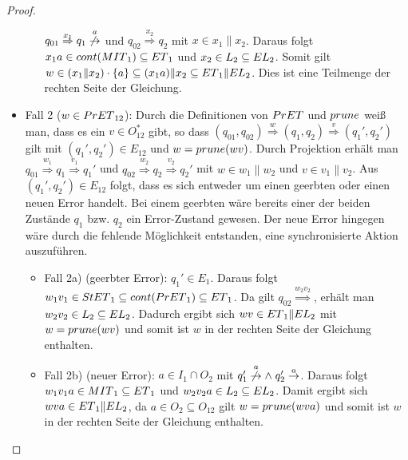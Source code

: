 \begin{proof}
\begin{itemize}
\begin{itemize}
      $q_{01}\overset{x_1}{\Rightarrow} q_1
      \overset{a}{\not{\hspace{-0.1cm}\rightarrow}}$ und
      $q_{02}\overset{x_2}{\Rightarrow} q_2$ mit $x\in x_1\|x_2$. Daraus folgt
      $x_1a\in cont{}(MIT{}_1)\subseteq ET{}_1$ und $x_2\in L_2\subseteq EL{}_2$. Somit
      gilt $w\in (x_1\| x_2)\cdot\{a\}\subseteq (x_1a)\|x_2\subseteq ET{}_1\|EL{}_2$.
      Dies ist eine Teilmenge der rechten Seite der Gleichung.
  \end{itemize}
    \item Fall 2 ($w\in PrET{}_{12}$): Durch die Definitionen von $PrET{}$
      und $prune{}$ weiß man, dass es ein $v\in O_{12}^*$ gibt, so dass
      $(q_{01},q_{02}) \overset{w}{\Rightarrow} (q_1,q_2)
      \overset{v}{\Rightarrow} (q_1',q_2')$ gilt mit $(q_1',q_2')\in E_{12}$
      und $w=prune{}(wv)$. Durch Projektion erhält man $q_{01}
      \overset{w_1}{\Rightarrow} q_1 \overset{v_1}{\Rightarrow} q_1'$ und
      $q_{02} \overset{w_2}{\Rightarrow} q_2 \overset{v_2}{\Rightarrow} q_2'$
      mit $w\in w_1\|w_2$ und $v\in v_1\|v_2$. Aus $(q_1',q_2')\in E_{12}$
      folgt, dass es sich entweder um einen geerbten oder einen neuen Error
      handelt. Bei einem geerbten wäre bereits einer der beiden Zustände $q_1$
      bzw. $q_2$ ein Error-Zustand gewesen. Der neue Error hingegen wäre durch
      die fehlende Möglichkeit entstanden, eine synchronisierte Aktion
      auszuführen.
      \begin{itemize}
        \item Fall 2a) (geerbter Error): \OBdA{} $q_1'\in E_1$. Daraus folgt
          $w_1v_1\in StET{}_1\subseteq cont{}(PrET{}_1)\subseteq ET{}_1$. Da gilt
          $q_{02}\overset{w_2v_2}{\Rightarrow}$, erhält man $w_2v_2\in
          L_2\subseteq EL{}_2$. Dadurch ergibt sich $wv\in ET{}_1\|EL{}_2$ mit
          $w=prune{}(wv)$ und somit ist $w$ in der rechten Seite der Gleichung
          enthalten.
        \item Fall 2b) (neuer Error): \OBdA{} $a\in I_1\cap O_2$ mit
          $q_1'\overset{a}{\not{\hspace{-0.1cm}\rightarrow}} \wedge \; q_2'
          \overset{a}{\rightarrow}$. Daraus folgt $w_1v_1a\in MIT{}_1\subseteq
          ET{}_1$ und $w_2v_2a\in L_2\subseteq EL{}_2$. Damit ergibt sich $wva\in
          ET{}_1\|EL{}_2$, da $a\in O_2\subseteq O_{12}$ gilt $w=prune{}(wva)$ und
          somit ist $w$ in der rechten Seite der Gleichung enthalten.
      \end{itemize}
  \end{itemize}


\end{proof}
